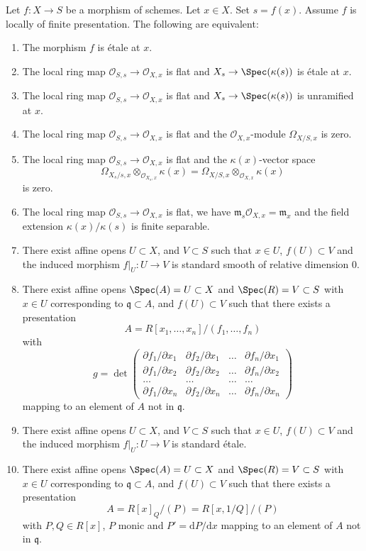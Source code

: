 \begin{lemma}
\label{lemma-etale-at-point}
Let $f : X \to S$ be a morphism of schemes.
Let $x \in X$.
Set $s = f(x)$.
Assume $f$ is locally of finite presentation.
The following are equivalent:
\begin{enumerate}
\item The morphism $f$ is \'etale at $x$.
\item The local ring map $\mathcal{O}_{S, s} \to \mathcal{O}_{X, x}$
is flat and $X_s \to \Spec(\kappa(s))$ is \'etale at $x$.
\item The local ring map $\mathcal{O}_{S, s} \to \mathcal{O}_{X, x}$
is flat and $X_s \to \Spec(\kappa(s))$ is unramified at $x$.
\item The local ring map $\mathcal{O}_{S, s} \to \mathcal{O}_{X, x}$
is flat and the $\mathcal{O}_{X, x}$-module $\Omega_{X/S, x}$
is zero.
\item The local ring map $\mathcal{O}_{S, s} \to \mathcal{O}_{X, x}$
is flat and the $\kappa(x)$-vector space
$$
\Omega_{X_s/s, x} \otimes_{\mathcal{O}_{X_s, x}} \kappa(x) =
\Omega_{X/S, x} \otimes_{\mathcal{O}_{X, x}} \kappa(x)
$$
is zero.
\item The local ring map $\mathcal{O}_{S, s} \to \mathcal{O}_{X, x}$
is flat, we have $\mathfrak m_s\mathcal{O}_{X, x} = \mathfrak m_x$ and
the field extension $\kappa(x)/\kappa(s)$ is finite
separable.
\item There exist affine opens $U \subset X$,
and $V \subset S$ such that $x \in U$, $f(U) \subset V$ and the
induced morphism $f|_U : U \to V$ is standard smooth
of relative dimension $0$.
\item There exist affine opens $\Spec(A) = U \subset X$
and $\Spec(R) = V \subset S$ with $x \in U$ corresponding
to $\mathfrak q \subset A$, and $f(U) \subset V$
such that there exists a presentation
$$
A = R[x_1, \ldots, x_n]/(f_1, \ldots, f_n)
$$
with
$$
g =
\det
\left(
\begin{matrix}
\partial f_1/\partial x_1 &
\partial f_2/\partial x_1 &
\ldots &
\partial f_n/\partial x_1 \\
\partial f_1/\partial x_2 &
\partial f_2/\partial x_2 &
\ldots &
\partial f_n/\partial x_2 \\
\ldots & \ldots & \ldots & \ldots \\
\partial f_1/\partial x_n &
\partial f_2/\partial x_n &
\ldots &
\partial f_n/\partial x_n
\end{matrix}
\right)
$$
mapping to an element of $A$ not in $\mathfrak q$.
\item There exist affine opens $U \subset X$,
and $V \subset S$ such that $x \in U$, $f(U) \subset V$ and the
induced morphism $f|_U : U \to V$ is standard \'etale.
\item There exist affine opens $\Spec(A) = U \subset X$
and $\Spec(R) = V \subset S$ with $x \in U$ corresponding
to $\mathfrak q \subset A$, and $f(U) \subset V$
such that there exists a presentation
$$
A = R[x]_Q/(P) = R[x, 1/Q]/(P)
$$
with $P, Q \in R[x]$, $P$ monic and $P' = \text{d}P/\text{d}x$ mapping to
an element of $A$ not in $\mathfrak q$.
\end{enumerate}
\end{lemma}

